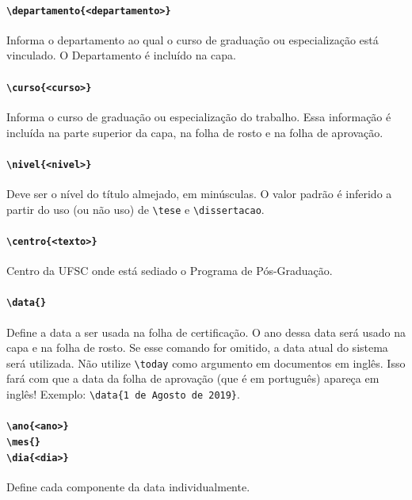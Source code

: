 \documentclass[embeddedlogo]{../ufsc-thesis-rn46-2019}
\newcommand{\lacmd}[1]{\texttt{\textbackslash{}#1}}
\begin{document}
\paragraph*{\lacmd{departamento\{<departamento>\}}} Informa o departamento ao
qual o curso de graduação ou especialização está vinculado. O Departamento é
incluído na capa.

\paragraph*{\lacmd{curso\{<curso>\}}} Informa o curso de graduação
ou especialização do trabalho. Essa informação é incluída na parte superior da
capa, na folha de rosto e na folha de aprovação.

\paragraph*{\lacmd{nivel\{<nivel>\}}} Deve ser o nível do título almejado, em
minúsculas. O valor padrão é inferido a partir do uso (ou não uso) de
\lacmd{tese} e \lacmd{dissertacao}.

\paragraph*{\lacmd{centro\{<texto>\}}} Centro da UFSC onde está sediado o
Programa de Pós-Graduação.

\paragraph*{\lacmd{data\{<data por extenso>\}}} Define a data a ser usada na
folha de certificação. O ano dessa data será usado na capa e na folha de
rosto. Se esse comando for omitido, a data atual do sistema será utilizada. Não
utilize \lacmd{today} como argumento em documentos em inglês. Isso fará com que
a data da folha de aprovação (que é em português) apareça em inglês! Exemplo:
\lacmd{data\{1 de Agosto de 2019\}}.

\paragraph*{\lacmd{ano\{<ano>\}} \\
            \lacmd{mes\{<nome do mes>\}} \\
            \lacmd{dia\{<dia>\}}}
Define cada componente da data individualmente.
\end{document}
